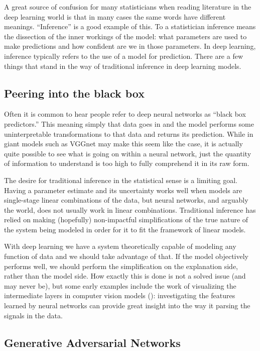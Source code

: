 \documentclass[]{book}
\theoremstyle{definition}
\theoremstyle{definition}
\theoremstyle{definition}
\theoremstyle{remark}
\begin{document}
A great source of confusion for many statisticians when reading
literature in the deep learning world is that in many cases the same
words have different meanings. ``Inference'' is a good example of this.
To a statistician inference means the dissection of the inner workings
of the model: what parameters are used to make predictions and how
confident are we in those parameters. In deep learning, inference
typically refers to the use of a model for prediction. There are a few
things that stand in the way of traditional inference in deep learning
models.

\subsection{Peering into the black
box}\label{peering-into-the-black-box}

Often it is common to hear people refer to deep neural networks as
``black box predictors.'' This meaning simply that data goes in and the
model performs some uninterpretable transformations to that data and
returns its prediction. While in giant models such as VGGnet may make
this seem like the case, it is actually quite possible to see what is
going on within a neural network, just the quantity of information to
understand is too high to fully comprehend it in its raw form.

The desire for traditional inference in the statistical sense is a
limiting goal. Having a parameter estimate and its uncertainty works
well when models are single-stage linear combinations of the data, but
neural networks, and arguably the world, does not usually work in linear
combinations. Traditional inference has relied on making (hopefully)
non-impactful simplifications of the true nature of the system being
modeled in order for it to fit the framework of linear models.

With deep learning we have a system theoretically capable of modeling
any function of data and we should take advantage of that. If the model
objectively performs well, we should perform the simplification on the
explanation side, rather than the model side. How exactly this is done
is not a solved issue (and may never be), but some early examples
include the work of visualizing the intermediate layers in computer
vision models (\citet{cnn_vis}): investigating the features learned by
neural networks can provide great insight into the way it parsing the
signals in the data.

\subsection{Generative Adversarial
Networks}\label{generative-adversarial-networks}
\end{document}
